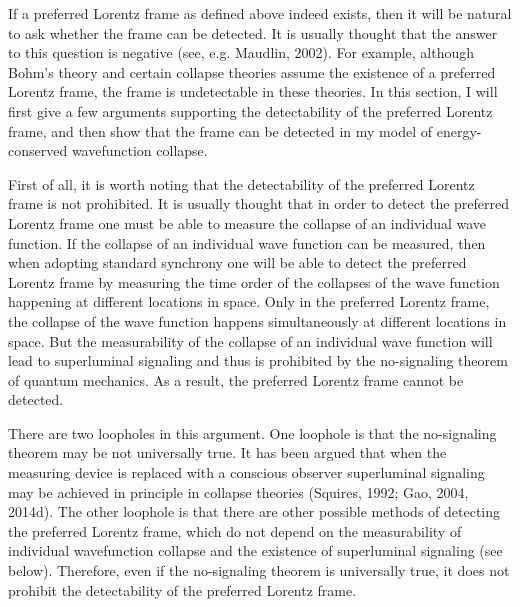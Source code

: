 If a preferred Lorentz frame as defined above indeed exists, then it will be natural to ask whether the frame can be detected. It is usually thought that the answer to this question is negative (see, e.g. Maudlin, 2002). For example, although Bohm's theory and certain collapse theories assume the existence of a preferred Lorentz frame, the frame is undetectable in these theories. In this section, I will first give a few arguments supporting the detectability of the preferred Lorentz frame, and then show that the frame can be detected in my model of energy-conserved wavefunction collapse.

First of all, it is worth noting that the detectability of the preferred Lorentz frame is not prohibited. 
It is usually thought that in order to detect the preferred Lorentz frame one must be able to measure the collapse of an individual wave function.
If the collapse of an individual wave function can be measured, then when adopting standard synchrony 
one will be able to detect the preferred Lorentz frame by measuring the time order of the collapses of the wave function happening at different locations in space. Only in the preferred Lorentz frame, the collapse of the wave function happens simultaneously at different locations in space.
But the measurability of the collapse of an individual wave function will lead to superluminal signaling and thus is prohibited by the no-signaling theorem of quantum mechanics. 
As a result, the preferred Lorentz frame cannot be detected.

There are two loopholes in this argument. 
One loophole is that the no-signaling theorem may be not universally true. It has been argued that when the measuring device is replaced with a conscious observer superluminal signaling may be achieved in principle in collapse theories (Squires, 1992; Gao, 2004, 2014d).
The other loophole is that there are  other possible methods of detecting the preferred Lorentz frame, which do not depend on the measurability of individual wavefunction collapse and the existence of superluminal signaling (see below). Therefore, even if the no-signaling theorem is universally true, it does not prohibit the detectability of the preferred Lorentz frame.

